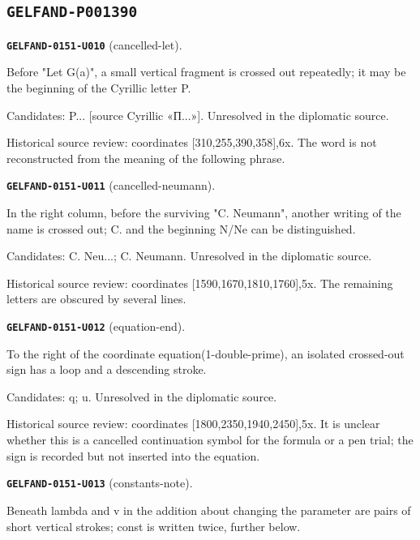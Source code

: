 \subsection*{\texttt{GELFAND-P001390}}
\par\noindent\leavevmode{}\label{GELFAND-0151-U010}\textbf{\texttt{GELFAND-0151-U010}} (cancelled-let).\nopagebreak[4]\par
Before "Let G(a)", a small vertical fragment is crossed out repeatedly; it may be the beginning of the Cyrillic letter P.\par
Candidates: P... [source Cyrillic «П...»]. Unresolved in the diplomatic source.\par
Historical source review: coordinates [310,255,390,358],6x. The word is not reconstructed from the meaning of the following phrase.\par
\medskip
\par\noindent\leavevmode{}\label{GELFAND-0151-U011}\textbf{\texttt{GELFAND-0151-U011}} (cancelled-neumann).\nopagebreak[4]\par
In the right column, before the surviving "C. Neumann", another writing of the name is crossed out; C. and the beginning N/Ne can be distinguished.\par
Candidates: C. Neu...; C. Neumann. Unresolved in the diplomatic source.\par
Historical source review: coordinates [1590,1670,1810,1760],5x. The remaining letters are obscured by several lines.\par
\medskip
\par\noindent\leavevmode{}\label{GELFAND-0151-U012}\textbf{\texttt{GELFAND-0151-U012}} (equation-end).\nopagebreak[4]\par
To the right of the coordinate equation(1-double-prime), an isolated crossed-out sign has a loop and a descending stroke.\par
Candidates: q; u. Unresolved in the diplomatic source.\par
Historical source review: coordinates [1800,2350,1940,2450],5x. It is unclear whether this is a cancelled continuation symbol for the formula or a pen trial; the sign is recorded but not inserted into the equation.\par
\medskip
\par\noindent\leavevmode{}\label{GELFAND-0151-U013}\textbf{\texttt{GELFAND-0151-U013}} (constants-note).\nopagebreak[4]\par
Beneath lambda and v in the addition about changing the parameter are pairs of short vertical strokes; const is written twice, further below.\par
